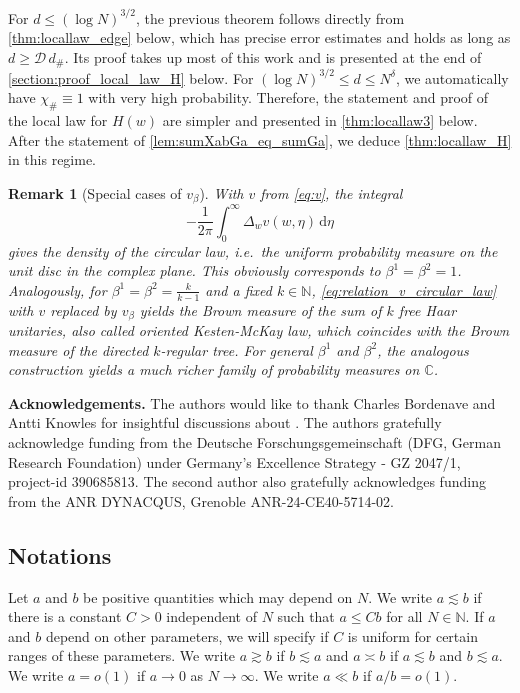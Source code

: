 \documentclass[11pt]{article}
\newcommand{\C}{\mathbb{C}}
\newcommand{\N}{\mathbb{N}}
\theoremstyle{plain}
\newtheorem{remark}{Remark}[section]
\theoremstyle{remark}
\numberwithin{equation}{section}
\begin{document}
		For $d \leq (\log N)^{3/2}$, the previous theorem follows directly from \cref{thm:locallaw_edge} below, which has precise error estimates and holds as long as  $d \geq \mathcal D \, d_\#$. Its proof takes up most of this work and is presented at the end of \cref{section:proof_local_law_H} below. 
	For $(\log N)^{3/2}\leq d \leq N^\delta$, we automatically have $\chi_\# \equiv 1$ with very high probability. Therefore, the statement and proof of the local law for $H(w)$ are simpler and presented in \cref{thm:locallaw3} below. After the statement of \cref{lem:sumXabGa_eq_sumGa}, we deduce \cref{thm:locallaw_H} in this regime.
	

		\begin{remark}[Special cases of $v_{\beta}$] \label{rem:v_beta_measures} 
	With $v$ from \cref{eq:v}, the integral 
	\begin{equation} \label{eq:relation_v_circular_law} 
	-\frac{1}{2\pi} \int_0^\infty \Delta_w v(w,\eta) \, \mathrm{d} \eta
	\end{equation} 
     gives the density of the circular law, i.e.\ the uniform probability measure on the unit disc in the complex plane. This obviously corresponds to $\beta^1=\beta^2 = 1$. Analogously, for $\beta^1 = \beta^2 = \frac{k}{k-1}$
	and a fixed $k\in \N$, 
	\cref{eq:relation_v_circular_law} with $v$ replaced by $v_\beta$ yields the Brown measure of the sum of $k$ free Haar unitaries, 
	also called oriented Kesten-McKay law, which coincides with the Brown measure of the directed 
	$k$-regular tree. For general $\beta^1$ and $\beta^2$, the analogous construction yields a much richer family of probability measures on $\C$. 
	\end{remark} 
	

	\textbf{Acknowledgements.}
	The authors would like to thank Charles Bordenave and Antti Knowles for insightful discussions about \cite{BBK_spec_radii}.
	The authors gratefully acknowledge funding from the Deutsche Forschungsgemeinschaft (DFG, German Research Foundation) under Germany's Excellence Strategy - GZ 2047/1, project-id 390685813. The second author also gratefully acknowledges funding from the ANR DYNACQUS, Grenoble ANR-24-CE40-5714-02.
	
	\subsection{Notations}
	\label{sec:notation}

Let $a$ and $b$ be positive quantities which may depend on $N$. 
We write $a \lesssim b$ if there is a constant $C>0$ independent of $N$ such that $a \leq C b$ for all $N \in \N$. If $a$ and $b$ depend on other parameters, we will specify if $C$ is uniform for certain ranges of these parameters. 
	We write $a \gtrsim b$ if $b \lesssim a$ and $a \asymp b$ if $a\lesssim b$ and $b \lesssim a$. We write $a = o(1)$ if $a \to 0$ as $N \to \infty$. We write $a \ll b$ if $a/b =o(1)$.
	
\end{document}
